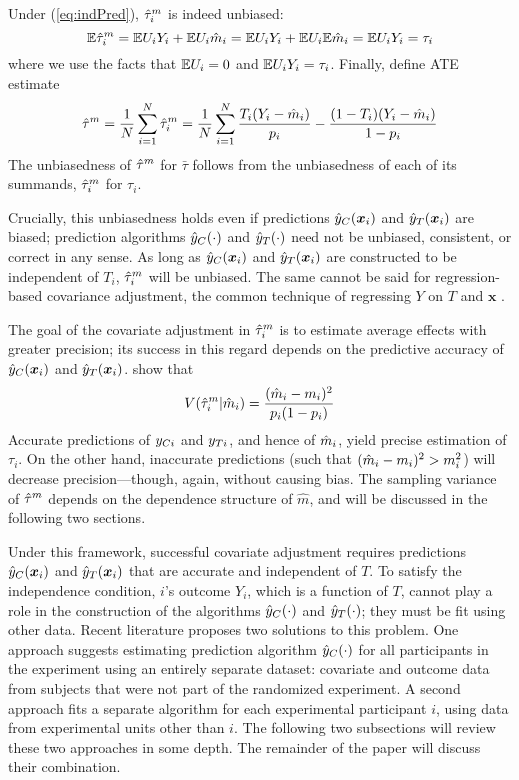 Under (\ref{eq:indPred}), $\hat{\tau}_i^m$ is indeed unbiased:
\begin{equation}
\mathbb{E} \hat{\tau}_i^m=\mathbb{E} U_iY_i+\mathbb{E} U_i\hat{m}_i=\mathbb{E} U_iY_i+\mathbb{E} U_i\mathbb{E}\hat{m}_i=\mathbb{E}
U_iY_i=\tau_i
\end{equation}
where we use the facts that $\mathbb{E} U_i=0$ and $\mathbb{E} U_iY_i=\tau_i$.
Finally, define ATE estimate
\begin{equation} \label{eq:thm}
\hat{\tau}^m=\frac{1}{N}\displaystyle\sum_{i=1}^N
\hat{\tau}_i^m=\frac{1}{N}\displaystyle\sum_{i=1}^N
\frac{T_i(Y_i-\hat{m}_i)}{p_i}-\frac{(1-T_i)(Y_i-\hat{m}_i)}{1-p_i}
\end{equation}
The unbiasedness of $\hat{\tau}^m$ for $\bar{\tau}$ follows from the
unbiasedness of each of its summands, $\hat{\tau}_i^m$ for $\tau_i$.

Crucially, this unbiasedness holds even if predictions $\hat{y}_C(\bm{x}_i)$ and $\hat{y}_T(\bm{x}_i)$ are biased; prediction algorithms $\hat{y}_C(\cdot)$ and $\hat{y}_T(\cdot)$ need not be unbiased, consistent, or correct in any sense.
As long as $\hat{y}_C(\bm{x}_i)$ and $\hat{y}_T(\bm{x}_i)$ are constructed to be independent
of $T_i$, $\hat{\tau}_i^m$ will be unbiased.
The same cannot be said for regression-based covariance
adjustment, the common technique of regressing $Y$ on $T$ and $\bm{x}$
\citep{freedman2008regression}.

The goal of the covariate adjustment in $\hat{\tau}_i^m$ is to estimate average
effects with greater precision;
its success in this regard depends on the predictive accuracy of $\hat{y}_C(\bm{x}_i)$ and $\hat{y}_T(\bm{x}_i)$.
\citet{loop} show that
\begin{equation}
V(\hat{\tau}_i^m|\hat{m}_i)=\frac{(\hat{m}_i-m_i)^2}{p_i(1-p_i)}
\end{equation}
Accurate predictions of $y_{Ci}$ and $y_{Ti}$, and hence of $\hat{m}_i$, yield precise estimation of $\tau_i$.
On the other hand, inaccurate predictions (such that
$(\hat{m}_i-m_i)^2>m_i^2$) will decrease precision---though, again, without
causing bias.
The sampling variance of $\hat{\tau}^m$ depends on the dependence structure of
$\hat{m}$, and will be discussed in the following two sections.

Under this framework, successful covariate adjustment
requires predictions $\hat{y}_C(\bm{x}_i) $ and $\hat{y}_T(\bm{x}_i) $ that are accurate and
independent of $T$.
To satisfy the independence condition, $i$'s outcome $Y_i$, which is a
function of $T$, cannot play a role in the construction of the algorithms $\hat{y}_C(\cdot)$ and
$\hat{y}_T(\cdot)$; they must be fit using other data.
Recent literature proposes two solutions to this problem.
 One approach \citep{rebarEDM} suggests
estimating prediction algorithm $\hat{y}_C(\cdot) $ for all participants in the
experiment using an entirely separate dataset: covariate and outcome data from subjects
that were not part of the randomized experiment.
A second approach \citep{loop} fits a separate algorithm for each
experimental participant $i$, using data from experimental units other
than $i$.
The following two subsections will review these two approaches in some
depth.
The remainder of the paper will discuss their combination.

